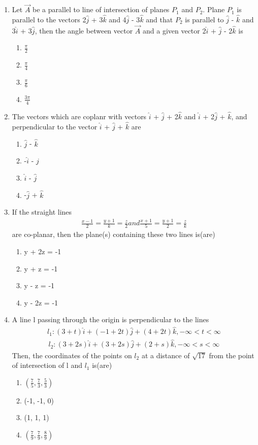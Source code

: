 \begin{enumerate}[label=\arabic*.,ref=\thesubsection.\theenumi]
\item Let $\overrightarrow{A}$ be a parallel to line of intersection of planes $P_1$ and $P_2$. Plane $P_1$ is parallel to the vectors 2$\hat{j}$ + 3$\hat{k}$ and 4$\hat{j}$ - 3$\hat{k}$ and that $P_2$ is parallel to 
$\hat{j}$ - $\hat{k}$ and 3$\hat{i}$ + 3$\hat{j}$, then the angle between vector $\overrightarrow{A}$ and a given vector 2$\hat{i}$ + $\hat{j}$ - 2$\hat{k}$ is
\begin{enumerate}
\item $\frac{\pi}{2}$
\item $\frac{\pi}{4}$
\item $\frac{\pi}{6}$
\item $\frac{3\pi}{4}$
\end{enumerate}

\item The vectors which are coplanr with vectors $\hat{i}$ + $\hat{j}$ + 2$\hat{k}$ and $\hat{i}$ + 2$\hat{j}$ + $\hat{k}$, and perpendicular to the vector $\hat{i}$ + $\hat{j}$ + $\hat{k}$ are
\begin{enumerate}
\item $\hat{j}$ - $\hat{k}$
\item -$\hat{i}$ - $\hat{j}$
\item $\hat{i}$ - $\hat{j}$
\item -$\hat{j}$ + $\hat{k}$
\end{enumerate}

\item If the straight lines 
\begin{align*}
\frac{x-1}{2} = \frac{y+1}{k} = \frac{z}{2} and \frac{x+1}{5} = \frac{y+1}{2} = \frac{z}{k}
\end{align*}
are co-planar, then the plane(s) containing these two lines is(are)
\begin{enumerate}
\item y + 2z = -1
\item y + z = -1
\item y - z = -1
\item y - 2z = -1
\end{enumerate}

\item A line l passing through the origin is perpendicular to the lines
\begin{align*}
l_1: (3 + t)\hat{i} + (-1 + 2t)\hat{j} + (4 + 2t)\hat{k}, -\infty < t < \infty
\end{align*}
\begin{align*}
l_2: (3 + 2s)\hat{i} + (3 + 2s)\hat{j} + (2 + s)\hat{k}, -\infty < s < \infty
\end{align*}
Then, the coordinates of the points on $l_2$ at a distance of $\sqrt{17}$ from the point of intersection of l and $l_1$ is(are)
\begin{enumerate}
\item $(\frac{7}{5}, \frac{7}{3}, \frac{5}{3})$
\item (-1, -1, 0)
\item (1, 1, 1)
\item $(\frac{7}{9}, \frac{7}{9}, \frac{8}{9})$
\end{enumerate}


\end{enumerate}

